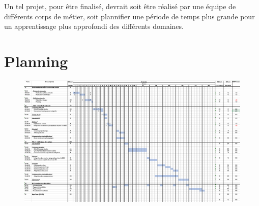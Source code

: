 \documentclass[
    iai, %
    il, %
]{heig-tb}
\begin{document}
Un tel projet, pour être finalisé, devrait soit être réalisé par une équipe de différents corps de métier,
soit plannifier une période de temps plus grande pour un apprentissage plus approfondi des différents domaines.

\vfil
\hspace{8cm}\makeatletter\@author\makeatother\par
\hspace{8cm}\begin{minipage}{5cm}
    \printsignature
\end{minipage}
\clearpage

\appendix
\appendixpage
\addappheadtotoc

\chapter{Planning}

\begin{figure}[H]
    \centering
    \includegraphics[scale=0.6, angle=90]{planning.png}
\end{figure}

\let\cleardoublepage\clearpage
\backmatter

\label{glossaire}
\printnoidxglossary
\printbibliography
\label{index}
\printindex
\end{document}
